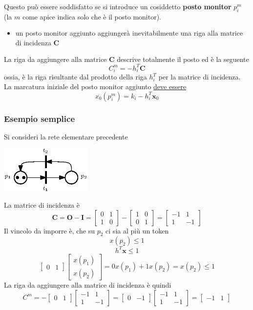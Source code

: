 \documentclass[10pt, letterpaper]{report}
\begin{document}
Questo può essere soddisfatto se si introduce un cosiddetto \textbf{posto monitor} $p_i^m$ (la $m$ come apice indica solo che è il posto monitor).\begin{itemize}
    \item un posto monitor aggiunto aggiungerà inevitabilmente una riga alla matrice di incidenza $\mathbf C$
\end{itemize}
La riga da aggiungere alla matrice $\mathbf C$ descrive totalmente il posto ed è la seguente 
$$ C_i^m=-h_i^T\mathbf C$$
ossia, è la riga risultante dal prodotto della riga $h_i^T$ per la matrice di incidenza. La marcatura iniziale del posto monitor aggiunto \underline{deve essere}
 $$ x_0(p_i^m)=k_{i}-h_{i}^T\mathbf x_0$$
\subsubsection{Esempio semplice}
Si consideri la rete elementare precedente
\begin{center}
    \includegraphics[width=0.34\textwidth]{images/PetriControlloPosti1.eps}
\end{center}
La matrice di incidenza è $$ 
    \mathbf C = \mathbf O - \mathbf I =\begin{bmatrix}
        0 & 1 \\ 
        1 & 0
    \end{bmatrix}-
     \begin{bmatrix}
    1 & 0 \\ 
    0 & 1
    \end{bmatrix} = 
\begin{bmatrix}
    -1 & 1 \\ 
    1 & -1
    \end{bmatrix}
$$
Il vincolo da imporre è, che su $p_2$ ci sia al più un token 
$$ x(p_2)\le 1$$
$$ h^T \mathbf x \le 1 $$
$$ \begin{bmatrix}
    0&
    1
\end{bmatrix}\begin{bmatrix}
    x(p_1)\\ 
    x(p_2)
\end{bmatrix}= 0x(p_1)+1x(p_2)=x(p_2)\le 1$$
La riga da aggiungere alla matrice di incidenza è quindi 
$$  C^m=-\begin{bmatrix}
    0&
    1
\end{bmatrix}\begin{bmatrix}
    -1 & 1 \\ 
    1 & -1
    \end{bmatrix}=\begin{bmatrix}
        0&
        -1
    \end{bmatrix}\begin{bmatrix}
        -1 & 1 \\ 
        1 & -1
        \end{bmatrix}=\begin{bmatrix}
            -1 & 1
        \end{bmatrix}$$
\end{document}
